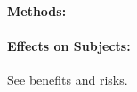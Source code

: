 \documentclass[12pt]{article}
\begin{document}
\paragraph{Methods:}
% 
% 
% 

\paragraph{Effects on Subjects:} See benefits and risks.
\end{document}
